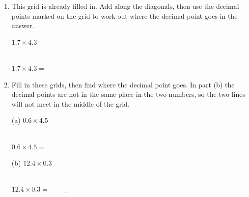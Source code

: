 \documentclass[12pt,a4paper]{article}
\newcommand{\ansline}[1][2.2cm]{\underline{\hspace{#1}}}
\newcommand{\lsetup}[2]{%
  \edef\lC{\the\numexpr#1\relax}\edef\lR{\the\numexpr#2\relax}%
  \edef\lCm{\the\numexpr#1-1\relax}\edef\lRm{\the\numexpr#2-1\relax}}
\newcommand{\lgrid}{%
  \draw[thick] (0,0) rectangle (\lC,\lR);
  \foreach \i in {1,...,\lCm}{\draw (\i,0) -- (\i,\lR);}
  \foreach \j in {1,...,\lRm}{\draw (0,\j) -- (\lC,\j);}
  \foreach \i in {1,...,\lC}{\foreach \j in {1,...,\lR}{%
    \draw[gray!75] ({\i-1},{\j-1}) -- (\i,\j);}}}
\newcommand{\ltop}[2]{\node[font=\small] at ({#1-0.5},{\lR+0.34}) {#2};}
\newcommand{\lside}[2]{\node[font=\small] at ({\lC+0.34},{\lR-#1+0.5}) {#2};}
\newcommand{\lcell}[4]{%
  \node[font=\small] at ({#1-0.72},{\lR-#2+0.70}) {#3};
  \node[font=\small] at ({#1-0.28},{\lR-#2+0.30}) {#4};}
\newcommand{\lanslines}{%
  \foreach \j in {1,...,\lR}{\draw[gray!60] (-0.74,{\lR-\j+0.28}) -- (-0.14,{\lR-\j+0.28});}
  \foreach \i in {1,...,\lC}{\draw[gray!60] ({\i-0.8},-0.6) -- ({\i-0.2},-0.6);}}
\newcommand{\ltopdot}[1]{\fill (#1,{\lR+0.2}) circle (1.8pt);}
\newcommand{\lsidedot}[1]{\fill ({\lC+0.34},{\lR-#1}) circle (1.8pt);}
\begin{document}
\begin{enumerate}[resume]

\newpage

\item This grid is already filled in. Add along the diagonals, then use the
decimal points marked on the grid to work out where the decimal point goes in
the answer.
\vspace{2pt}

\begin{center}
\begin{minipage}[t]{0.44\linewidth}
\centering
$1.7\times4.3$\\[4pt]
\\[8pt]
$1.7\times4.3=\ansline[2cm]$
\end{minipage}
\end{center}

\item Fill in these grids, then find where the decimal point goes. In part (b)
the decimal points are not in the same place in the two numbers, so the two
lines will not meet in the middle of the grid.
\vspace{2pt}

\begin{minipage}[t]{0.42\linewidth}
\centering
(a) $0.6\times4.5$\\[4pt]
\\[8pt]
$0.6\times4.5=\ansline[2cm]$
\end{minipage}%
\begin{minipage}[t]{0.58\linewidth}
\centering
(b) $12.4\times0.3$\\[4pt]
\\[8pt]
$12.4\times0.3=\ansline[2cm]$
\end{minipage}


\end{enumerate}
\end{document}
